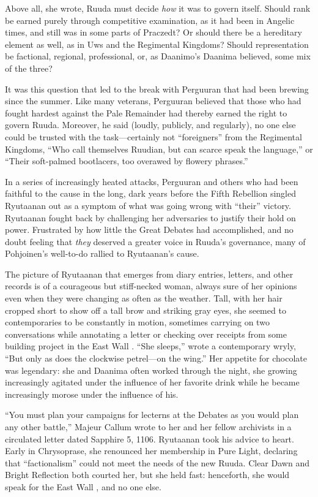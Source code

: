 \documentclass[12pt]{report}
\begin{document}
Above all, she wrote, Ruuda must decide \emph{how} it was to govern
itself.  Should rank be earned purely through competitive examination,
as it had been in Angelic times, and still was in some parts of
Praczedt?  Or should there be a hereditary element as well, as in Uws
and the Regimental Kingdoms?  Should representation be factional,
regional, professional, or, as Daanimo's Daanima believed, some mix of
the three?

It was this question that led to the break with Perguuran that had
been brewing since the summer.  Like many veterans, Perguuran believed
that those who had fought hardest against the Pale Remainder had
thereby earned the right to govern Ruuda.  Moreover, he said (loudly,
publicly, and regularly), no one else could be trusted with the
task---certainly not ``foreigners'' from the Regimental Kingdoms, ``Who
call themselves Ruudian, but can scarce speak the language,'' or ``Their
soft-palmed bootlacers, too overawed by flowery phrases.''

In a series of increasingly heated attacks, Perguuran and others who
had been faithful to the {\aemott} cause in the long, dark years
before the Fifth Rebellion singled Ryutaanan out as a symptom of what
was going wrong with ``their'' victory.  Ryutaanan fought back by
challenging her adversaries to justify their hold on power.
Frustrated by how little the Great Debates had accomplished, and no
doubt feeling that \emph{they} deserved a greater voice in Ruuda's
governance, many of Pohjoinen's well-to-do rallied to Ryutaanan's
cause.

The picture of Ryutaanan that emerges from diary entries, letters, and
other records is of a courageous but stiff-necked woman, always sure
of her opinions even when they were changing as often as the weather.
Tall, with her hair cropped short to show off a tall brow and striking
gray eyes, she seemed to contemporaries to be constantly in motion,
sometimes carrying on two conversations while annotating a letter or
checking over receipts from some building project in the East Wall
.  ``She sleeps,'' wrote a contemporary wryly, ``But only
as does the clockwise petrel---on the wing.''  Her appetite for
chocolate was legendary: she and Daanima often worked through the
night, she growing increasingly agitated under the influence of her
favorite drink while he became increasingly morose under the influence
of his.

``You must plan your campaigns for lecterns at the Debates as you would
plan any other battle,'' Majeur Callum wrote to her and her fellow
archivists in a circulated letter dated Sapphire 5, 1106.  Ryutaanan
took his advice to heart.  Early in Chrysoprase, she renounced her
membership in Pure Light, declaring that ``factionalism'' could not meet
the needs of the new Ruuda.  Clear Dawn and Bright Reflection both
courted her, but she held fast: henceforth, she would speak for the
East Wall , and no one else.
\end{document}
